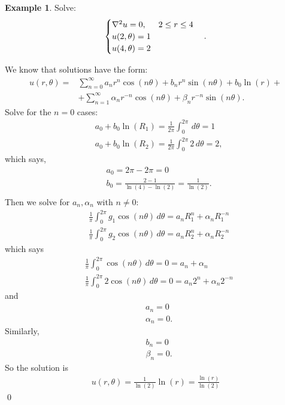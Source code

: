 \documentclass{book}
\theoremstyle{definition}
\newtheorem{exmp}{Example}[section]
\newcommand{\f}[2]{\frac{#1}{#2}}
\begin{document}
\begin{exmp}
	Solve:
	\begin{align*}
	\begin{cases}
	\laplacian u = 0, \hspace{0.5cm} 2\leq r\leq 4\\
	u(2,\theta) = 1\\
	u(4,\theta) = 2
	\end{cases}.
	\end{align*}
	
	We know that solutions have the form:
	\begin{align*}
	u(r,\theta) =& \sum^\infty_{n=0} a_n r^n \cos(n\theta) + b_n r^{n}\sin(n\theta) + b_0\ln(r) +\\
	&+\sum^\infty_{n=1}\alpha_n r^{-n}\cos(n\theta) + \beta_n r^{-n}\sin(n\theta). 
	\end{align*}
	Solve for the $n=0$ cases:
	\begin{align*}
	&a_0 + b_0 \ln(R_1) = \f{1}{2\pi}\int^{2\pi}_0 \,d\theta = 1\\
	&a_0 + b_0 \ln(R_2) = \f{1}{2\pi}\int^{2\pi}_0 2\,d\theta = 2,
	\end{align*}
	which says,
	\begin{align*}
	&a_0 = 2\pi - 2\pi = 0\\
	&b_0 = \frac{2-1}{\ln(4) - \ln(2)} = \f{1}{\ln(2)}.\\
	\end{align*}
	Then we solve for $a_n, \alpha_n$ with $n\neq 0$:
	\begin{align*}
	&\f{1}{\pi}\int^{2\pi}_0 g_1\cos(n\theta)\,d\theta = a_n R_1^n + \alpha_n R_1^{-n}\\
	&\f{1}{\pi}\int^{2\pi}_0 g_2\cos(n\theta)\,d\theta = a_n R_2^n + \alpha_n R_2^{-n}
	\end{align*}
	which says
	\begin{align*}
	&\f{1}{\pi}\int^{2\pi}_0 \cos(n\theta)\,d\theta = 0  = a_n+ \alpha_n\\
	&\f{1}{\pi}\int^{2\pi}_0 2\cos(n\theta)\,d\theta = 0 = a_n 2^n + \alpha_n 2^{-n}
	\end{align*}
	and
	\begin{align*}
	&a_n = 0\\
	&\alpha_n = 0.
	\end{align*}
	Similarly, 
	\begin{align*}
	&b_n = 0\\
	&\beta_n = 0.
	\end{align*}
	So the solution is
	\begin{align*}
	\boxed{u(r,\theta) = \f{1}{\ln(2)}\ln(r) = \f{\ln(r)}{\ln(2)}}
	\end{align*}\qed
\end{exmp}
\end{document}
